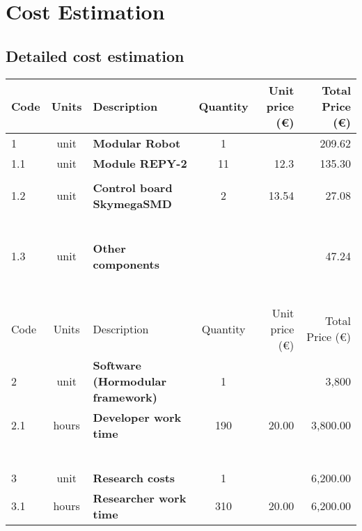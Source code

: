 \chapter{Cost Estimation}
\label{app:cost_estimation}

\section{Detailed cost estimation}

\begin{longtable}{l c p{7cm} c r r}
    \hline
    Code & Units & Description  & Quantity & Unit price (\euro) & Total Price (\euro)  \\ \hline \hline 
    
    1 & unit & \textbf{Modular Robot} & 1 & \multicolumn{1}{r}{} & 209.62 \\ \hline 
    
    1.1 & unit & \textbf{Module REPY-2} & 11 & 12.3 & 135.30 \\ \hline  
    
    
    \\ \hline
    
    1.2 & unit & \textbf{Control board SkymegaSMD} & 2 & 13.54 & 27.08 \\ \hline  
    
    
    \\~\\ \hline
    
    1.3 & unit & \textbf{Other components} &  & \multicolumn{1}{r}{} & 47.24 \\ \hline  
        
    
    \\ 

    \\~\\  \hline

Code & Units & Description  & Quantity & Unit price (\euro) & Total Price (\euro)  \\ \hline \hline \hline
    2 & unit & \textbf{Software (Hormodular framework)} & 1 & \multicolumn{1}{r}{} & 3,800 \\ \hline
    2.1 & hours & \textbf{Developer work time} & 190 & 20.00 & 3,800.00 \\ \hline  
    
    \\~\\ \hline
    3 & unit & \textbf{Research costs} & 1 & \multicolumn{1}{r}{} & 6,200.00 \\ \hline
    3.1 & hours & \textbf{Researcher work time} & 310 & 20.00 & 6,200.00 \\ \hline  
   
\end{longtable}

